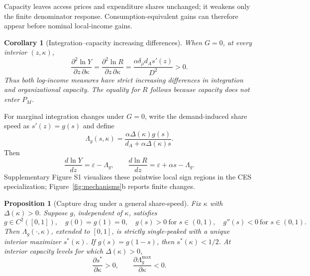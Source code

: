 \documentclass[11pt]{article}
\theoremstyle{plain}
\newtheorem{proposition}{Proposition}
\newtheorem{corollary}{Corollary}
\theoremstyle{definition}
\begin{document}
Capacity leaves access prices and expenditure shares unchanged; it weakens only
the finite denominator response. Consumption-equivalent gains can therefore
appear before nominal local-income gains.

\begin{corollary}[Integration--capacity increasing differences]
\label{cor:increasing-differences}
When \(G=0\), at every interior \((z,\kappa)\),
\begin{equation}
 \frac{\partial^2\ln Y}{\partial z\,\partial\kappa}
 =\frac{\partial^2\ln R}{\partial z\,\partial\kappa}
 =\frac{\alpha\delta_\rho d_A s'(z)}{D^2}>0.
 \label{eq:increasing-differences}
\end{equation}
Thus both log-income measures have strict increasing differences in integration
and organizational capacity. The equality for \(R\) follows because capacity
does not enter \(P_M\).
\end{corollary}

For marginal integration changes under \(G=0\), write the demand-induced share speed as
\(s'(z)=g(s)\) and define
\begin{equation}
 \Lambda_g(s,\kappa)=
 \frac{\alpha\Delta(\kappa)g(s)}
 {d_A+\alpha\Delta(\kappa)s}.
 \label{eq:general-drag}
\end{equation}
Then
\begin{equation}
 \frac{d\ln Y}{dz}=\varepsilon-\Lambda_g,
 \qquad
\frac{d\ln R}{dz}=\varepsilon+\alpha s-\Lambda_g.
\label{eq:marginal-effects}
\end{equation}
Supplementary Figure S1 visualizes these pointwise local sign regions in the
CES specialization; Figure~\ref{fig:mechanisms}b reports finite changes.

\begin{proposition}[Capture drag under a general share-speed]
\label{prop:general-share-speed}
Fix \(\kappa\) with \(\Delta(\kappa)>0\). Suppose \(g\), independent of
\(\kappa\), satisfies
\begin{equation}
 g\in C^2([0,1]),\quad g(0)=g(1)=0,\quad
 g(s)>0\ \text{for }s\in(0,1),\quad
 g''(s)<0\ \text{for }s\in(0,1).
 \label{eq:general-speed-assumptions}
\end{equation}
Then \(\Lambda_g(\cdot,\kappa)\), extended to \([0,1]\), is strictly
single-peaked with a unique interior maximizer \(s^*(\kappa)\). If
\(g(s)=g(1-s)\), then \(s^*(\kappa)<1/2\). At interior capacity levels for
which \(\Delta(\kappa)>0\),
\begin{equation}
 \frac{\partial s^*}{\partial\kappa}>0,
 \qquad
 \frac{\partial\Lambda_g^{\max}}{\partial\kappa}<0.
 \label{eq:peak-capacity-signs}
\end{equation}
\end{proposition}
\end{document}

